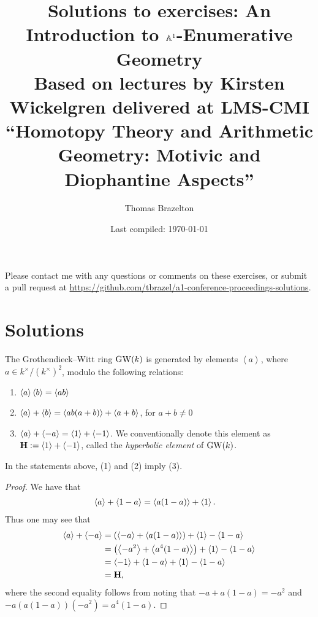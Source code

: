 \documentclass[english]{article}
\begin{document}
\title{Solutions to exercises: An Introduction to $\mathbb{A}^1$-Enumerative Geometry \\ \large Based on lectures by Kirsten Wickelgren delivered at LMS-CMI ``Homotopy Theory and Arithmetic Geometry: Motivic and Diophantine Aspects''}
\author{Thomas Brazelton}
\date{Last compiled: \today}
\maketitle

Please contact me with any questions or comments on these exercises, or submit a pull request at \href{https://github.com/tbrazel/a1-conference-proceedings-solutions}{https://github.com/tbrazel/a1-conference-proceedings-solutions}.



\section*{Solutions}




\setcounter{section}{1}
\setcounter{subsection}{2}

The Grothendieck--Witt ring $\text{GW}(k)$ is generated by elements $\left\langle a \right\rangle$, where $a\in k^\times / \left( k^\times \right)^2$, modulo the following relations:
\begin{enumerate}
\item $\left\langle a \right\rangle\left\langle b \right\rangle = \left\langle ab \right\rangle$
\item $\left\langle a \right\rangle + \left\langle b \right\rangle = \left\langle ab(a+b) \right\rangle + \left\langle a+b \right\rangle$, for $a+b \neq 0$
\item $\left\langle a \right\rangle+\left\langle -a \right\rangle = \left\langle 1 \right\rangle + \left\langle -1 \right\rangle$. We conventionally denote this element as $\textbf{H} := \left\langle 1 \right\rangle + \left\langle -1 \right\rangle$, called the \textit{hyperbolic element} of $\text{GW}(k)$.
\end{enumerate}
\begin{exercise} In the statements above, (1) and (2) imply (3).
\end{exercise}
\begin{proof} We have that
\begin{align*}
	\left\langle a \right\rangle + \left\langle 1-a \right\rangle &= \left\langle a(1-a) \right\rangle + \left\langle 1 \right\rangle.
\end{align*}
Thus one may see that
\begin{align*}
	\left\langle a \right\rangle + \left\langle -a \right\rangle &= \left( \left\langle -a \right\rangle + \left\langle a(1-a) \right\rangle \right) + \left\langle 1 \right\rangle - \left\langle 1-a \right\rangle \\
	&= \left( \left\langle -a^2 \right\rangle + \left\langle a^4(1-a) \right\rangle \right) + \left\langle 1 \right\rangle - \left\langle 1-a \right\rangle \\
	&= \left\langle -1 \right\rangle + \left\langle 1-a \right\rangle + \left\langle 1 \right\rangle - \left\langle 1-a \right\rangle \\
	&= \textbf{H},
\end{align*}
where the second equality follows from noting that $-a + a(1-a) = -a^2$ and $-a \left( a(1-a) \right)(-a^2) = a^4(1-a)$.
\end{proof}
\end{document}
